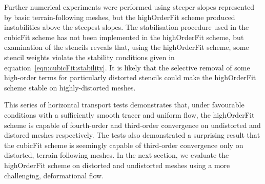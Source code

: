 Further numerical experiments were performed using steeper slopes represented by basic terrain-following meshes, but the highOrderFit scheme produced instabilities above the steepest slopes.
The stabilisation procedure used in the cubicFit scheme has not been implemented in the highOrderFit scheme, but examination of the stencils reveals that, using the highOrderFit scheme, some stencil weights violate the stability conditions given in equation~\eqref{eqn:cubicFit:stability}.
It is likely that the selective removal of some high-order terms for particularly distorted stencils could make the highOrderFit scheme stable on highly-distorted meshes.

This series of horizontal transport tests demonstrates that, under favourable conditions with a sufficiently smooth tracer and uniform flow, the highOrderFit scheme is capable of fourth-order and third-order convergence on undistorted and distored meshes respectively.
The tests also demonstrated a surprising result that the cubicFit scheme is seemingly capable of third-order convergence only on distorted, terrain-following meshes.
In the next section, we evaluate the highOrderFit scheme on distorted and undistorted meshes using a more challenging, deformational flow.
